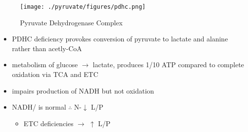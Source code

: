 \documentclass{scrartcl}
\begin{document}
\begin{figure}[htbp]
\centering
\texttt{[image: ./pyruvate/figures/pdhc.png]}
\caption[pdhc]{\label{fig:org29629ff}
Pyruvate Dehydrogenase Complex}
\end{figure}

\begin{itemize}
\item PDHC deficiency provokes conversion of pyruvate to lactate and alanine rather than acetly-CoA
\item metabolism of glucose \(\to\) lactate, produces 1/10 ATP compared to
complete oxidation via TCA and ETC
\item impairs production of NADH but not oxidation
\item NADH/ is normal \(\therefore\) N-\(\downarrow\) L/P
\begin{itemize}
\item ETC deficiencies \(\to\) \(\uparrow\) L/P
\end{itemize}
\end{itemize}
\end{document}
